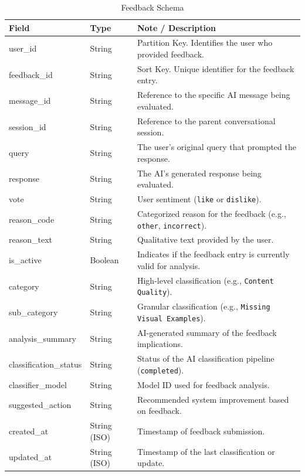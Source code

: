 \begin{table}[H]
    \centering
    \begin{tabular}{llp{8cm}}
        \toprule
        \textbf{Field} & \textbf{Type} & \textbf{Note / Description} \\
        \midrule
        user\_id & String & Partition Key. Identifies the user who provided feedback. \\
        feedback\_id & String & Sort Key. Unique identifier for the feedback entry. \\
        \midrule
        message\_id & String & Reference to the specific AI message being evaluated. \\
        session\_id & String & Reference to the parent conversational session. \\
        query & String & The user's original query that prompted the response. \\
        response & String & The AI's generated response being evaluated. \\
        vote & String & User sentiment (\texttt{like} or \texttt{dislike}). \\
        reason\_code & String & Categorized reason for the feedback (e.g., \texttt{other}, \texttt{incorrect}). \\
        reason\_text & String & Qualitative text provided by the user. \\
        is\_active & Boolean & Indicates if the feedback entry is currently valid for analysis. \\
        category & String & High-level classification (e.g., \texttt{Content Quality}). \\
        sub\_category & String & Granular classification (e.g., \texttt{Missing Visual Examples}). \\
        analysis\_summary & String & AI-generated summary of the feedback implications. \\
        classification\_status & String & Status of the AI classification pipeline (\texttt{completed}). \\
        classifier\_model & String & Model ID used for feedback analysis. \\
        suggested\_action & String & Recommended system improvement based on feedback. \\
        created\_at & String (ISO) & Timestamp of feedback submission. \\
        updated\_at & String (ISO) & Timestamp of the last classification or update. \\
        \bottomrule
    \end{tabular}
    \caption{Feedback Schema}
    \label{tab:feedback_results}
\end{table}


